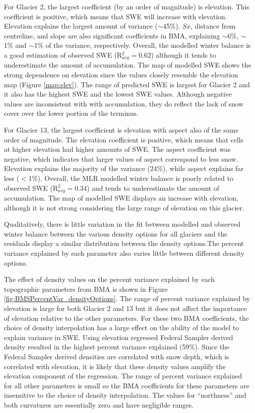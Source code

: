 \documentclass[12pt]{article}
\begin{document}
For Glacier 2, the largest coefficient (by an order of magnitude) is elevation. This coefficient is positive, which means that SWE will increase with elevation. Elevation explains the largest amount of variance ($\sim$45\%). $Sx$, distance from centreline, and slope are also significant coefficients in BMA, explaining $\sim$6\%, $\sim$1\% and $\sim$1\% of the variance, respectively.  Overall, the modelled winter balance is a good estimation of observed SWE (R$^2_{avg}=0.62$) although it tends to underestimate the amount of accumulation. The map of modelled SWE shows the strong dependence on elevation since the values closely resemble the elevation map (Figure \ref{map:elev}). The range of predicted SWE is largest for Glacier 2 and it also has the highest SWE and the lowest SWE values. Although negative values are inconsistent with with accumulation, they do reflect the lack of snow cover over the lower portion of the terminus. 

For Glacier 13, the largest coefficient is elevation with aspect also of the same order of magnitude. The elevation coefficient is positive, which means that cells at higher elevation had higher amounts of SWE. The aspect coefficient was negative, which indicates that larger values of aspect correspond to less snow. Elevation explains the majority of the variance (24\%), while aspect explains far less ($<$1\%).  Overall, the MLR modelled winter balance is poorly related to observed SWE (R$^2_{avg}=0.34$) and tends to underestimate the amount of accumulation. The map of modelled SWE displays an increase with elevation, although it is not strong considering the large range of elevation on this glacier.

Qualitatively, there is little variation in the fit between modelled and observed winter balance between the various density options for all glaciers and the residuals display a similar distribution between the density options.The percent variance explained by each parameter also varies little between different density options. 

The effect of density values on the percent variance explained by each topographic parameters from BMA is shown in Figure \ref{fig:BMSPercentVar_densityOptions}. The range of percent variance explained by elevation is large for both Glacier 2 and 13 but it does not affect the importance of elevation relative to the other parameters. For these two BMA coefficients, the choice of density interpolation has a large effect on the ability of the model to explain variance in SWE. Using elevation regressed Federal Sampler derived density resulted in the highest percent variance explained (59\%). Since the Federal Sampler derived densities are correlated with snow depth, which is correlated with elevation, it is likely that these density values amplify the elevation component of the regression. The range of percent variance explained for all other parameters is small so the BMA coefficients for these parameters are insensitive to the choice of density interpolation. The values for ``northness'' and both curvatures are essentially zero and have negligible ranges. 
\end{document}

